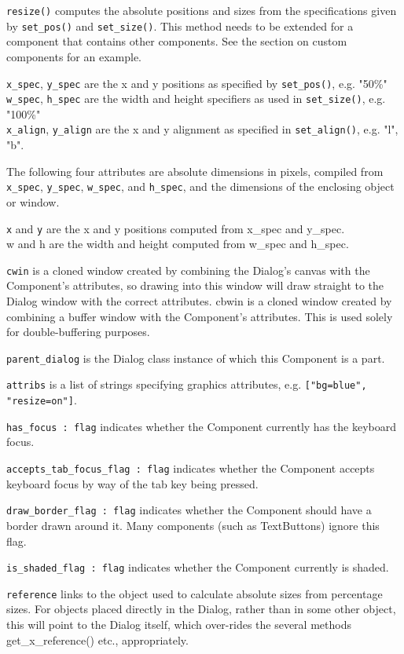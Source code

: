 \texttt{resize()} computes the absolute positions and sizes from the
specifications given by \texttt{set\_pos()} and
\texttt{set\_size()}. This method needs
to be extended for a component that contains other components. See the
section on custom components for an example.

\texttt{x\_spec}, \texttt{y\_spec} are the x and y positions as specified by \texttt{set\_pos()},
e.g. "50\%"\\
\texttt{w\_spec}, \texttt{h\_spec} are the width and height specifiers
as used in \texttt{set\_size()}, e.g. "100\%"\\
\texttt{x\_align}, \texttt{y\_align} are the x and y alignment as specified in
\texttt{set\_align()}, e.g. "l",
"b".

The following four attributes are absolute dimensions in pixels,
compiled from \texttt{x\_spec}, \texttt{y\_spec}, \texttt{w\_spec},
and \texttt{h\_spec}, and the
dimensions of the enclosing object or window.

\texttt{x} and \texttt{y} are the x and y positions computed from x\_spec and
y\_spec.\\
w and h are the width and height computed from w\_spec and h\_spec.

\texttt{cwin} is a cloned window created by combining the
Dialog's canvas with the Component's
attributes, so drawing into this window will draw straight to the
Dialog window with the correct attributes. cbwin is a cloned window
created by combining a buffer window with the
Component's attributes. This is used solely for
double-buffering purposes.

\texttt{parent\_dialog} is the Dialog class instance of which
this Component is a part.

\texttt{attribs} is a list of strings specifying graphics attributes, e.g.
\texttt{["bg=blue", "resize=on"]}.

\texttt{has\_focus : flag} indicates whether the Component currently has the
keyboard focus.

\texttt{accepts\_tab\_focus\_flag : flag} indicates whether the
Component accepts keyboard focus by way of the tab key being pressed.

\texttt{draw\_border\_flag : flag} indicates whether the Component should have a
border drawn around it. Many components (such as TextButtons) ignore
this flag.

\texttt{is\_shaded\_flag : flag} indicates whether the Component
currently is shaded.

\texttt{reference} links to the object used to calculate absolute sizes from
percentage sizes. For objects placed directly in the Dialog, rather
than in some other object, this will point to the Dialog itself,
which over-rides the several methods get\_x\_reference() etc.,
appropriately.

